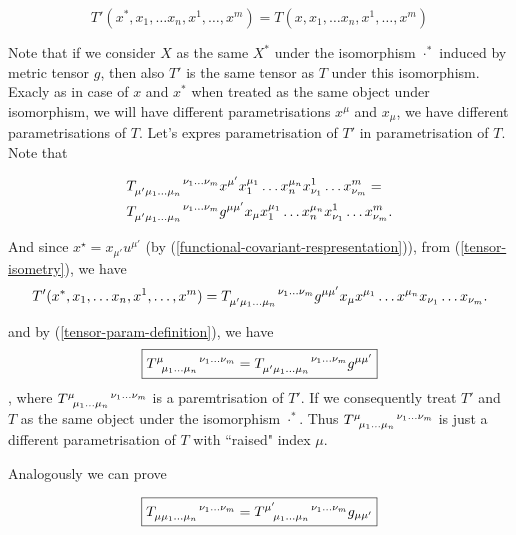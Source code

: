 \documentclass[main.tex]{subfiles}
\begin{document}
\begin{equation}
\label{tensor-isometry}
T'(x^*, x_1, \dots x_n, x^1, \dots, x^m) = T(x, x_1, \dots x_n, x^1, \dots, x^m)
\end{equation}

Note that if we consider $X$ as the same $X^*$ under the isomorphism $\cdot^*$ induced by metric tensor $g$, then also $T'$ is the same tensor as $T$ under this isomorphism. Exacly as in case of $x$ and $x^*$ when treated as the same object under isomorphism, we will have different parametrisations $x^\mu$ and $x_\mu$, we have different parametrisations of $T$. Let's expres parametrisation of $T'$ in parametrisation of $T$. Note that

\begin{align*}
& \tensor{{T}}{_{\mu'}_{\mu_1\dots\mu_n}^{\nu_1\dots\nu_m}} x^{\mu'} x_1^{\mu_1} \dots x_n^{\mu_n} x^1_{\nu_1} \dots x^m_{\nu_m} = \\
& \tensor{{T}}{_{\mu'}_{\mu_1\dots\mu_n}^{\nu_1\dots\nu_m}} g^{\mu \mu'} x_{\mu} x_1^{\mu_1} \dots x_n^{\mu_n} x^1_{\nu_1} \dots x^m_{\nu_m}.
\end{align*}

And since $x^\star = x_{\mu'} u^{\mu'}$ (by (\ref{functional-covariant-respresentation})), from (\ref{tensor-isometry}), we have
\begin{equation}
T'(x^*, x_1, \dots x_n, x^1, \dots, x^m) = \tensor{{T}}{_{\mu'}_{\mu_1\dots\mu_n}^{\nu_1\dots\nu_m}} g^{\mu \mu'} x_{\mu} x^{\mu_1} \dots x^{\mu_n} x_{\nu_1} \dots x_{\nu_m}.
\end{equation}

and by (\ref{tensor-param-definition}), we have
\begin{equation}
\boxed{
\tensor{T}{^\mu_{\mu_1\dots\mu_n}^{\nu_1\dots\nu_m}}  = \tensor{T}{_{\mu'}_{\mu_1\dots\mu_n}^{\nu_1\dots\nu_m}} g^{\mu \mu'}
}
\end{equation}, 
where
$\tensor{T}{^\mu_{\mu_1\dots\mu_n}^{\nu_1\dots\nu_m}}$ is a paremtrisation of $T'$. If we consequently treat $T'$ and $T$ as the same object under the isomorphism $\cdot^*$. Thus 
$\tensor{T}{^\mu_{\mu_1\dots\mu_n}^{\nu_1\dots\nu_m}}$ is just a different parametrisation of $T$ with ``raised" index $\mu$.

Analogously we can prove

\begin{equation}
\boxed{
\tensor{T}{_\mu_{\mu_1\dots\mu_n}^{\nu_1\dots\nu_m}}  = \tensor{T}{^{\mu'}_{\mu_1\dots\mu_n}^{\nu_1\dots\nu_m}} g_{\mu \mu'}
}
\end{equation}
\end{document}
